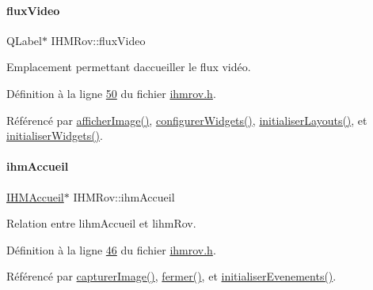 \paragraph{\texorpdfstring{flux\+Video}{fluxVideo}}
{\footnotesize\ttfamily Q\+Label$\ast$ I\+H\+M\+Rov\+::flux\+Video\hspace{0.3cm}{\ttfamily [private]}}



Emplacement permettant d\textquotesingle{}accueiller le flux vidéo. 



Définition à la ligne \hyperlink{ihmrov_8h_source_l00050}{50} du fichier \hyperlink{ihmrov_8h_source}{ihmrov.\+h}.



Référencé par \hyperlink{ihmrov_8cpp_source_l00154}{afficher\+Image()}, \hyperlink{ihmrov_8cpp_source_l00050}{configurer\+Widgets()}, \hyperlink{ihmrov_8cpp_source_l00061}{initialiser\+Layouts()}, et \hyperlink{ihmrov_8cpp_source_l00033}{initialiser\+Widgets()}.

\mbox{\label{class_i_h_m_rov_aa22f6fe8daf5c67071ec02a348e5cc3e}} 
\paragraph{\texorpdfstring{ihm\+Accueil}{ihmAccueil}}
{\footnotesize\ttfamily \hyperlink{class_i_h_m_accueil}{I\+H\+M\+Accueil}$\ast$ I\+H\+M\+Rov\+::ihm\+Accueil\hspace{0.3cm}{\ttfamily [private]}}



Relation entre l\textquotesingle{}ihm\+Accueil et l\textquotesingle{}ihm\+Rov. 



Définition à la ligne \hyperlink{ihmrov_8h_source_l00046}{46} du fichier \hyperlink{ihmrov_8h_source}{ihmrov.\+h}.



Référencé par \hyperlink{ihmrov_8cpp_source_l00179}{capturer\+Image()}, \hyperlink{ihmrov_8cpp_source_l00253}{fermer()}, et \hyperlink{ihmrov_8cpp_source_l00098}{initialiser\+Evenements()}.

\mbox{\label{class_i_h_m_rov_a0896dea1a2d901a7cf43a344e22fc66d}} 
